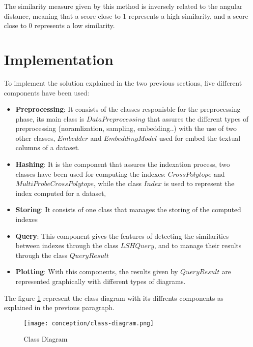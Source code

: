 The similarity measure given by this method is inversely related to the angular
distance, meaning that a score close to 1 represents a high similarity, and a
score close to 0 represents a low similarity.


\section{Implementation}
To implement the solution explained in the two previous sections, five different
components have been used:

\begin{itemize}
    \item \textbf{Preprocessing}: It consists of the classes responisble for the
    preprocessing phase, its main class is $DataPreprocessing$ that assures the
    different types of preprocessing (noramlization, sampling, embedding..) with
    the use of two other classes, $Embedder$ and $EmbeddingModel$ used for embed
    the textual columns of a dataset.
    \item \textbf{Hashing}: It is the component that assures the indexation
    process, two classes have been used for computing the indexes:
    $CrossPolytope$ and $MultiProbeCrossPolytope$, while the class $Index$ is
    used to represent the index computed for a dataset, 
    \item \textbf{Storing}: It consists of one class that manages the storing
    of the computed indexes
    \item \textbf{Query}: This component gives the features of detecting the
    similarities between indexes through the class $LSHQuery$, and to manage
    their results through the class $QueryResult$
    \item \textbf{Plotting}: With this components, the results given by
    $QueryResult$ are represented graphically with different types of diagrams.
\end{itemize}

The figure \ref{fig:class_diagram} represent the class diagram with its
diffrents components as explained in the previous paragraph.

\begin{figure}[h]
    \centering
    \texttt{[image: conception/class-diagram.png]}
    \caption{Class Diagram}
    \label{fig:class_diagram}
\end{figure}